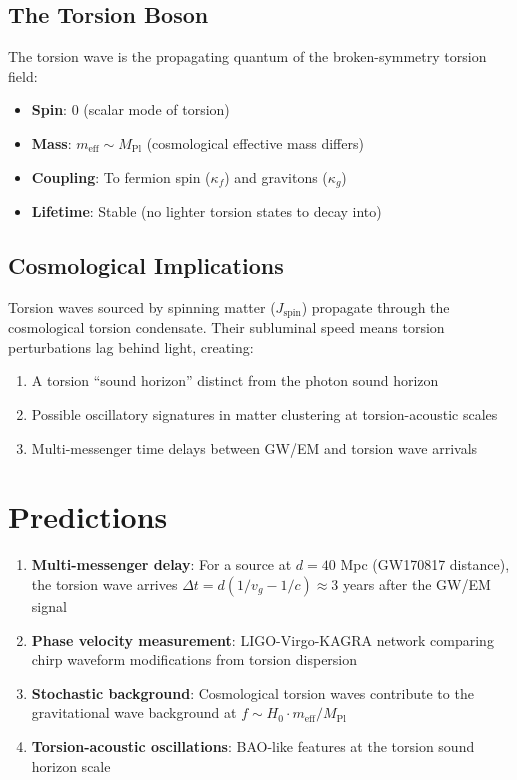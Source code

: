 \documentclass[twocolumn,prd,superscriptaddress,nofootinbib]{revtex4-2}
\begin{document}
\subsection{The Torsion Boson}

The torsion wave is the propagating quantum of the broken-symmetry torsion field:
\begin{itemize}
\item \textbf{Spin}: 0 (scalar mode of torsion)
\item \textbf{Mass}: $m_\text{eff} \sim M_\text{Pl}$ (cosmological effective mass differs)
\item \textbf{Coupling}: To fermion spin ($\kappa_f$) and gravitons ($\kappa_g$)
\item \textbf{Lifetime}: Stable (no lighter torsion states to decay into)
\end{itemize}

\subsection{Cosmological Implications}

Torsion waves sourced by spinning matter ($J_\text{spin}$) propagate through the cosmological torsion condensate. Their subluminal speed means torsion perturbations lag behind light, creating:
\begin{enumerate}
\item A torsion ``sound horizon'' distinct from the photon sound horizon
\item Possible oscillatory signatures in matter clustering at torsion-acoustic scales
\item Multi-messenger time delays between GW/EM and torsion wave arrivals
\end{enumerate}

\section{Predictions}

\begin{enumerate}
\item \textbf{Multi-messenger delay}: For a source at $d = 40$ Mpc (GW170817 distance), the torsion wave arrives $\Delta t = d(1/v_g - 1/c) \approx 3$ years after the GW/EM signal
\item \textbf{Phase velocity measurement}: LIGO-Virgo-KAGRA network comparing chirp waveform modifications from torsion dispersion
\item \textbf{Stochastic background}: Cosmological torsion waves contribute to the gravitational wave background at $f \sim H_0 \cdot m_\text{eff}/M_\text{Pl}$
\item \textbf{Torsion-acoustic oscillations}: BAO-like features at the torsion sound horizon scale
\end{enumerate}
\end{document}
